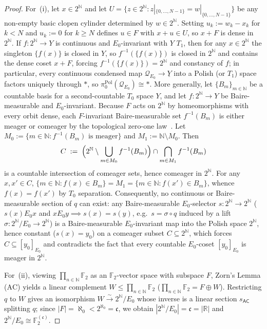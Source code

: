 \begin{proof}
For~(i), let $x \in 2^{\mathbb{N}}$ and let $U = \{z \in 2^{\mathbb{N}} : z|_{\{0,\dots,N-1\}} = w|_{\{0,\dots,N-1\}}\}$ be any non-empty basic clopen cylinder determined by $w \in 2^{\mathbb{N}}$. Setting $u_k := w_k - x_k$ for $k < N$ and $u_k := 0$ for $k \ge N$ defines $u \in F$ with $x + u \in U$, so $x + F$ is dense in $2^{\mathbb{N}}$. If $f : 2^{\mathbb{N}} \to Y$ is continuous and $E_0$-invariant with $Y$ $T_1$, then for any $x \in 2^{\mathbb{N}}$ the singleton $\{f(x)\}$ is closed in $Y$, so $f^{-1}(\{f(x)\})$ is closed in $2^{\mathbb{N}}$ and contains the dense coset $x + F$, forcing $f^{-1}(\{f(x)\}) = 2^{\mathbb{N}}$ and constancy of $f$; in particular, every continuous condensed map $\mathcal{Q}_{E_0} \to \underline{Y}$ into a Polish (or $T_1$) space factors uniquely through $*$, so $\pi_0^{\mathrm{Pol}}(\mathcal{Q}_{E_0}) \cong *$. More generally, let $\{B_m\}_{m \in \mathbb{N}}$ be a countable basis for a second-countable $T_0$ space $Y$, and let $f : 2^{\mathbb{N}} \to Y$ be Baire-measurable and $E_0$-invariant. Because $F$ acts on $2^{\mathbb{N}}$ by homeomorphisms with every orbit dense, each $F$-invariant Baire-measurable set $f^{-1}(B_m)$ is either meager or comeager by the topological zero-one law~\cite[Theorem~8.46]{Kechris95}. Let $M_0 := \{m \in \mathbb{N} : f^{-1}(B_m) \text{ is meager}\}$ and $M_1 := \mathbb{N} \setminus M_0$. Then
\[
  C \;:=\; \Bigl(2^{\mathbb{N}} \setminus \bigcup_{m \in M_0} f^{-1}(B_m)\Bigr) \cap \bigcap_{m \in M_1} f^{-1}(B_m)
\]
is a countable intersection of comeager sets, hence comeager in $2^{\mathbb{N}}$. For any $x, x' \in C$, $\{m \in \mathbb{N} : f(x) \in B_m\} = M_1 = \{m \in \mathbb{N} : f(x') \in B_m\}$, whence $f(x) = f(x')$ by $T_0$ separation. Consequently, no continuous or Baire-measurable section of $q$ can exist: any Baire-measurable $E_0$-selector $s : 2^{\mathbb{N}} \to 2^{\mathbb{N}}$ ($s(x) \mathrel{E_0} x$ and $x \mathrel{E_0} y \implies s(x) = s(y)$, e.g.\ $s = \sigma \circ q$ induced by a lift $\sigma : 2^{\mathbb{N}}/E_0 \to 2^{\mathbb{N}}$) is a Baire-measurable $E_0$-invariant map into the Polish space $2^{\mathbb{N}}$, hence constant ($s(x) = y_0$) on a comeager subset $C \subseteq 2^{\mathbb{N}}$, which forces $C \subseteq [y_0]_{E_0}$ and contradicts the fact that every countable $E_0$-coset $[y_0]_{E_0}$ is meager in $2^{\mathbb{N}}$.

For~(ii), viewing $\prod_{n \in \mathbb{N}} \mathbb{F}_2$ as an $\mathbb{F}_2$-vector space with subspace $F$, Zorn's Lemma ($\mathrm{AC}$) yields a linear complement $W \le \prod_{n \in \mathbb{N}} \mathbb{F}_2$ ($\prod_{n \in \mathbb{N}} \mathbb{F}_2 = F \oplus W$). Restricting $q$ to $W$ gives an isomorphism $W \xrightarrow{\sim} 2^{\mathbb{N}}/E_0$ whose inverse is a linear section $s_{\mathsf{AC}}$ splitting $q$; since $|F| = \aleph_0 < 2^{\aleph_0} = \mathfrak{c}$, we obtain $|2^{\mathbb{N}}/E_0| = \mathfrak{c} = |\mathbb{R}|$ and $2^{\mathbb{N}}/E_0 \cong \mathbb{F}_2^{(\mathfrak{c})}$.


\end{proof}
